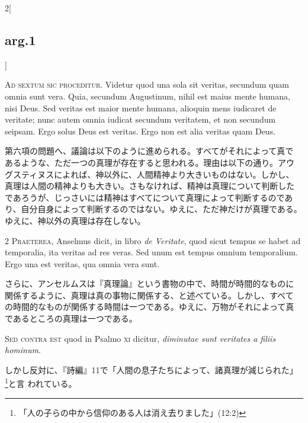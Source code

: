 \documentclass[paper=a4paper,fontsize=10pt,jafontsize=9pt,titlepage]{jlreq}
\begin{document}
\begin{paracol}{2}[\subsection{arg.1}]


{\huge A}{\scshape d sextum sic proceditur}. Videtur quod una sola sit
veritas, secundum quam omnia sunt vera. Quia, secundum Augustinum,
nihil est maius mente humana, nisi Deus. Sed veritas est maior mente
humana, alioquin mens iudicaret de veritate; nunc autem omnia iudicat
secundum veritatem, et non secundum seipsam. Ergo solus Deus est
veritas. Ergo non est alia veritas quam Deus.

\switchcolumn

第六項の問題へ、議論は以下のように進められる。すべてがそれによって真で
あるような、ただ一つの真理が存在すると思われる。理由は以下の通り。アウ
グスティヌスによれば、神以外に、人間精神より大きいものはない。しかし、
真理は人間の精神よりも大きい。さもなければ、精神は真理について判断した
であろうが、じっさいには精神はすべてについて真理によって判断するのであ
り、自分自身によって判断するのではない。ゆえに、ただ神だけが真理である。
ゆえに、神以外の真理は存在しない。

\switchcolumn*


2 {\scshape Praeterea}, Anselmus dicit, in libro {\itshape de
Veritate}, quod sicut tempus se habet ad temporalia, ita veritas ad
res veras. Sed unum est tempus omnium temporalium. Ergo una est
veritas, qua omnia vera sunt.

\switchcolumn

さらに、アンセルムスは『真理論』という書物の中で、時間が時間的なものに
関係するように、真理は真の事物に関係する、と述べている。しかし、すべて
の時間的なものが関係する時間は一つである。ゆえに、万物がそれによって真
であるところの真理は一つである。

\switchcolumn*[\subsection{s.c.}]


{\scshape Sed contra est} quod in Psalmo {\scshape xi} dicitur,
{\itshape diminutae sunt veritates a filiis hominum}.

\switchcolumn

しかし反対に、『詩編』11で「人間の息子たちによって、諸真理が減じられた」
\footnote{「人の子らの中から信仰のある人は消え去りました」(12:2)}と言
われている。




\end{paracol}
\end{document}
